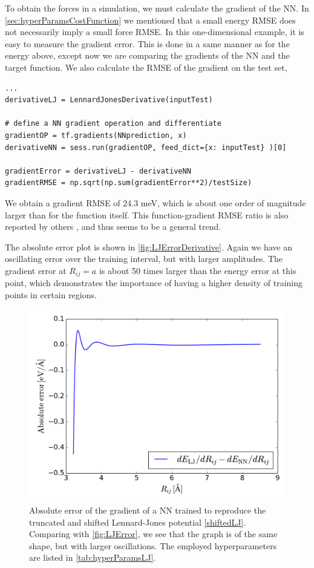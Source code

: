 \documentclass[twoside,english]{uiofysmaster}
\begin{document}
To obtain the forces in a simulation, we must calculate the gradient of the NN. 
In \autoref{sec:hyperParamsCostFunction} we mentioned that a small energy RMSE does not 
necessarily imply a small force RMSE. In this one-dimensional example, it is easy to measure the gradient error. 
This is done in a same manner as for the energy above, except now we are comparing the gradients of the NN and the target function. 
We also calculate the RMSE of the gradient on the test set,
\begin{verbatim}
...
derivativeLJ = LennardJonesDerivative(inputTest)

# define a NN gradient operation and differentiate
gradientOP = tf.gradients(NNprediction, x)
derivativeNN = sess.run(gradientOP, feed_dict={x: inputTest} )[0]

gradientError = derivativeLJ - derivativeNN
gradientRMSE = np.sqrt(np.sum(gradientError**2)/testSize)
\end{verbatim}
We obtain a gradient RMSE of 24.3 meV, which is about one order of magnitude larger than for the function itself. 
This function-gradient RMSE ratio is also reported by others \cite{Natarajan16} \cite{Artrith12}, and thus seems 
to be a general trend. 

The absolute error plot is shown in \autoref{fig:LJErrorDerivative}. 
Again we have an oscillating error over the training interval, but with 
larger amplitudes. The gradient error at $R_{ij} = a$ is about 50 times larger than the energy error at this point, which  
demonstrates the importance of having a higher density of training points in certain regions. 
\begin{figure}
\centering
  \includegraphics[width = 0.7\linewidth]{Figures/Implementation/LJErrorDerivative.pdf}
  \caption{Absolute error of the gradient of a NN trained to reproduce the truncated and shifted Lennard-Jones 
           potential \eqref{shiftedLJ}. Comparing with \autoref{fig:LJError}, we see that the graph is of the same shape, 
           but with larger oscillations. The employed hyperparameters are listed in \autoref{tab:hyperParamsLJ}. }
  \label{fig:LJErrorDerivative}
\end{figure}
\end{document}
